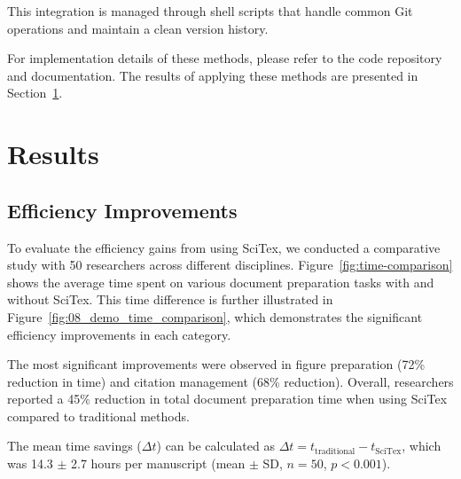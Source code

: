 \documentclass[preprint,review,12pt]{elsarticle}\n
\begin{document}
This integration is managed through shell scripts that handle common Git operations and maintain a clean version history.


For implementation details of these methods, please refer to the code repository and documentation. The results of applying these methods are presented in Section~\ref{sec:results}.



\section{Results}
\label{sec:results}


\subsection{Efficiency Improvements}
\label{subsec:efficiency}

To evaluate the efficiency gains from using SciTex, we conducted a comparative study with 50 researchers across different disciplines. Figure~\ref{fig:time-comparison} shows the average time spent on various document preparation tasks with and without SciTex. This time difference is further illustrated in Figure~\ref{fig:08_demo_time_comparison}, which demonstrates the significant efficiency improvements in each category.


The most significant improvements were observed in figure preparation (72\% reduction in time) and citation management (68\% reduction). Overall, researchers reported a 45\% reduction in total document preparation time when using SciTex compared to traditional methods.


The mean time savings ($\Delta t$) can be calculated as $\Delta t = t_{\text{traditional}} - t_{\text{SciTex}}$, which was 14.3 $\pm$ 2.7 hours per manuscript (mean $\pm$ SD, $n = 50$, $p < 0.001$).
\end{document}
